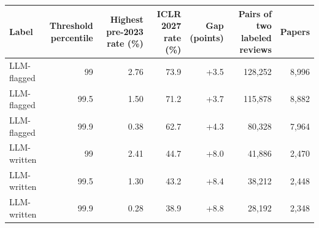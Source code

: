 \begin{tabular}{@{}lrrrrrr@{}}
\toprule
Label & \shortstack[r]{Threshold\\percentile} & \shortstack[r]{Highest pre-2023\\rate (\%)} & \shortstack[r]{ICLR 2027\\rate (\%)} & \shortstack[r]{Gap\\(points)} & \shortstack[r]{Pairs of two\\labeled reviews} & Papers \\
\midrule
LLM-flagged & 99 & 2.76 & 73.9 & +3.5 & 128,252 & 8,996 \\
LLM-flagged & 99.5 & 1.50 & 71.2 & +3.7 & 115,878 & 8,882 \\
LLM-flagged & 99.9 & 0.38 & 62.7 & +4.3 & 80,328 & 7,964 \\
\midrule
LLM-written & 99 & 2.41 & 44.7 & +8.0 & 41,886 & 2,470 \\
LLM-written & 99.5 & 1.30 & 43.2 & +8.4 & 38,212 & 2,448 \\
LLM-written & 99.9 & 0.28 & 38.9 & +8.8 & 28,192 & 2,348 \\
\bottomrule
\end{tabular}
